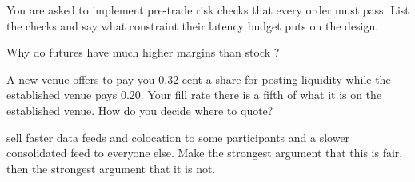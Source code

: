 \begin{interviewq}\label{iq:m1:exchanges-brokers-venues:3}
You are asked to implement pre-trade risk checks that every order must pass.
List the checks and say what constraint their latency budget puts on the
design.
\end{interviewq}

\begin{interviewq}\label{iq:m1:exchanges-brokers-venues:4}
Why do futures  have much higher margins than stock ?
\end{interviewq}

\begin{interviewq}\label{iq:m1:exchanges-brokers-venues:5}
A new venue offers to pay you 0.32 cent a share for posting liquidity while
the established venue pays 0.20. Your fill rate there is a fifth of what it
is on the established venue. How do you decide where to quote?
\end{interviewq}

\begin{interviewq}\label{iq:m1:exchanges-brokers-venues:6}
 sell faster data feeds and colocation to some participants and a
slower consolidated feed to everyone else. Make the strongest argument that
this is fair, then the strongest argument that it is not.
\end{interviewq}
